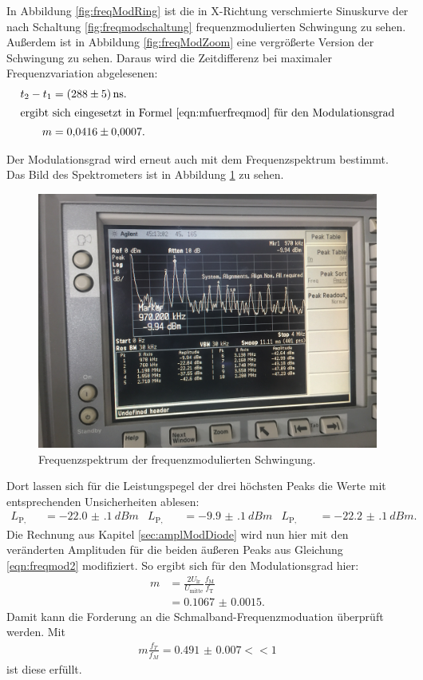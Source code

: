 In Abbildung \ref{fig:freqModRing} ist die in X-Richtung verschmierte Sinuskurve der nach Schaltung \ref{fig:freqmodschaltung} frequenzmodulierten Schwingung zu sehen. Außerdem ist in Abbildung \ref{fig:freqModZoom} eine vergrößerte Version der Schwingung zu sehen. Daraus wird die Zeitdifferenz bei maximaler Frequenzvariation abgelesenen:
\begin{align*}
  t_2 - t_1 &= \SI{288(5)}{\nano\second}.\\
\intertext{ergibt sich eingesetzt in Formel \eqref{eqn:mfuerfreqmod} für den Modulationsgrad}
  m &= \num{0.0416(7)}.
\end{align*}

Der Modulationsgrad wird erneut auch mit dem Frequenzspektrum bestimmt. Das Bild des Spektrometers ist in Abbildung \ref{fig:freqModSpek} zu sehen.
\begin{figure}[h]
  \centering
  \includegraphics[width=.9\textwidth]{Spektrum_Pics/d.jpg}
  \caption{Frequenzspektrum der frequenzmodulierten Schwingung.}
  \label{fig:freqModSpek}
\end{figure}
Dort lassen sich für die Leistungspegel der drei höchsten Peaks die Werte mit entsprechenden Unsicherheiten ablesen:
\begin{align*}
  L_\text{P, links} &= \SI{-22.0(1)}{dBm} & L_\text{P, mitte} &= \SI{-9.9(1)}{dBm} & L_\text{P, rechts} &= \SI{-22.2(1)}{dBm}.
\end{align*}
Die Rechnung aus Kapitel \ref{sec:amplModDiode} wird nun hier mit den veränderten Amplituden für die beiden äußeren Peaks aus Gleichung \eqref{eqn:freqmod2} modifiziert. So ergibt sich für den Modulationsgrad hier:
\begin{align*}
  m &= \frac{2 U_\text{lr}}{U_\text{mitte}} \frac{f_\text{M}}{f_\text{T}}\\
  &= \num{0.1067(15)}.
\end{align*}
Damit kann die Forderung an die Schmalband-Frequenzmoduation überprüft werden. Mit
\begin{align*}
  m \frac{f_T}{f_M} = \num{0.491(7)} << 1
\end{align*}
ist diese erfüllt.

